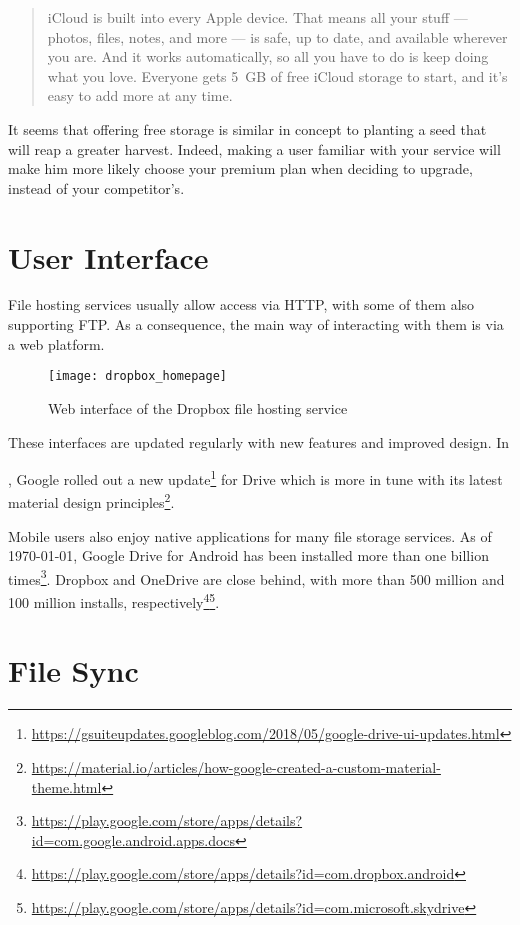 \begin{quote}
iCloud is built into every Apple device. That means all your stuff — photos, files, notes, and more — is safe, up to date, and available wherever you are. And it works automatically, so all you have to do is keep doing what you love. Everyone gets \mbox{5 GB} of free iCloud storage to start, and it’s easy to add more at any time.
\end{quote}

It seems that offering free storage is similar in concept to planting a seed that will reap a greater harvest. Indeed, making a user familiar with your service will make him more likely choose your premium plan when deciding to upgrade, instead of your competitor's.

\section{User Interface}

File hosting services usually allow access via \mbox{HTTP}, with some of them also supporting \mbox{FTP}. As a consequence, the main way of interacting with them is via a web platform.

\begin{figure}[tbp]
\caption{Web interface of the Dropbox file hosting service}
\centering
\texttt{[image: dropbox\_homepage]}
\end{figure}

These interfaces are updated regularly with new features and improved design. In \date{May 2018}, Google rolled out a new update\footnote{\url{https://gsuiteupdates.googleblog.com/2018/05/google-drive-ui-updates.html}} for Drive which is more in tune with its latest material design principles\footnote{\url{https://material.io/articles/how-google-created-a-custom-material-theme.html}}.

Mobile users also enjoy native applications for many file storage services. As of \monthyeardate\today, Google Drive for Android has been installed more than one billion times\footnote{\url{https://play.google.com/store/apps/details?id=com.google.android.apps.docs}}. Dropbox and OneDrive are close behind, with more than 500 million and 100 million installs, respectively\footnote{\url{https://play.google.com/store/apps/details?id=com.dropbox.android}}\footnote{\url{https://play.google.com/store/apps/details?id=com.microsoft.skydrive}}.

\section{File Sync}


